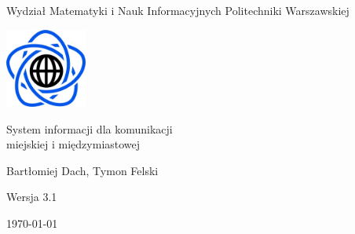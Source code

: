 \documentclass[10pt,a4paper]{article}
\begin{document}
\begin{titlepage}
	\centering
	{\Large Wydział Matematyki i Nauk Informacyjnych Politechniki Warszawskiej \par}
	\vspace{1cm}
	\includegraphics[width=0.2\textwidth]{Resources/Images/logo.png} \par
	\vspace{5cm}
	{\LARGE System informacji dla komunikacji \\ miejskiej i międzymiastowej \par}
	\vspace{0.5cm}
	{\Large Bartłomiej Dach, Tymon Felski \par}
	\vspace{1.5cm}
	{\Large Wersja 3.1 \par}
	\vspace{1.5cm}
	{\Large \today \par}
\end{titlepage}
\end{document}
